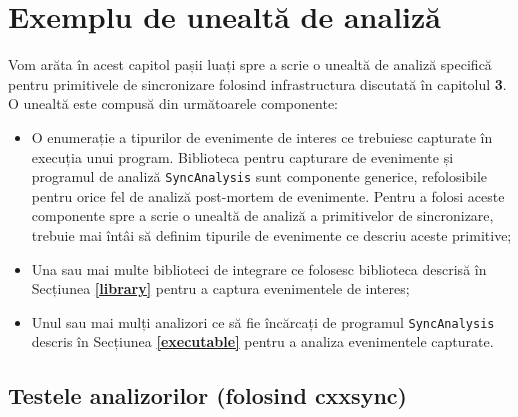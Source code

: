 \section{Exemplu de unealtă de analiză}

Vom arăta în acest capitol pașii luați spre a scrie o unealtă de analiză
specifică pentru primitivele de sincronizare folosind infrastructura
discutată în capitolul \textbf{3}. O unealtă este compusă din
următoarele componente:
\begin{itemize}
    \item O enumerație a tipurilor de evenimente de interes ce
    trebuiesc capturate în execuția unui program. Biblioteca pentru
    capturare de evenimente și programul de analiză
    \lstinline{SyncAnalysis} sunt componente generice, refolosibile
    pentru orice fel de analiză post-mortem de evenimente. Pentru a
    folosi aceste componente spre a scrie o unealtă de analiză a
    primitivelor de sincronizare, trebuie mai întâi să definim tipurile
    de evenimente ce descriu aceste primitive;
    \item Una sau mai multe biblioteci de integrare ce folosesc
    biblioteca descrisă în Secțiunea \textbf{\ref{library}} pentru a
    captura evenimentele de interes;
    \item Unul sau mai mulți analizori ce să fie încărcați de programul
    \lstinline{SyncAnalysis} descris în Secțiunea
    \textbf{\ref{executable}} pentru a analiza evenimentele capturate.
\end{itemize}







\subsection{Testele analizorilor (folosind cxxsync)}
\label{analyzer-tests}
